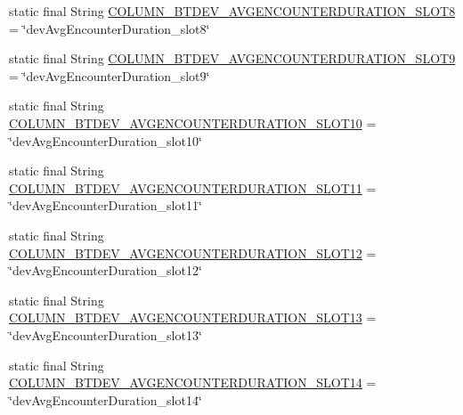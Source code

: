 \begin{DoxyCompactItemize}
\item 
static final String \hyperlink{classcom_1_1copelabs_1_1oiframework_1_1socialproximity_1_1_s_q_lite_helper_afa1acefb9ac52993d28799345bf94d49}{C\+O\+L\+U\+M\+N\+\_\+\+B\+T\+D\+E\+V\+\_\+\+A\+V\+G\+E\+N\+C\+O\+U\+N\+T\+E\+R\+D\+U\+R\+A\+T\+I\+O\+N\+\_\+\+S\+L\+O\+T8} = \char`\"{}dev\+Avg\+Encounter\+Duration\+\_\+slot8\char`\"{}
\item 
static final String \hyperlink{classcom_1_1copelabs_1_1oiframework_1_1socialproximity_1_1_s_q_lite_helper_a39c07bc84c3220997df50296c7d58ec0}{C\+O\+L\+U\+M\+N\+\_\+\+B\+T\+D\+E\+V\+\_\+\+A\+V\+G\+E\+N\+C\+O\+U\+N\+T\+E\+R\+D\+U\+R\+A\+T\+I\+O\+N\+\_\+\+S\+L\+O\+T9} = \char`\"{}dev\+Avg\+Encounter\+Duration\+\_\+slot9\char`\"{}
\item 
static final String \hyperlink{classcom_1_1copelabs_1_1oiframework_1_1socialproximity_1_1_s_q_lite_helper_ab21157b336ae9f13c90f0589426c9d81}{C\+O\+L\+U\+M\+N\+\_\+\+B\+T\+D\+E\+V\+\_\+\+A\+V\+G\+E\+N\+C\+O\+U\+N\+T\+E\+R\+D\+U\+R\+A\+T\+I\+O\+N\+\_\+\+S\+L\+O\+T10} = \char`\"{}dev\+Avg\+Encounter\+Duration\+\_\+slot10\char`\"{}
\item 
static final String \hyperlink{classcom_1_1copelabs_1_1oiframework_1_1socialproximity_1_1_s_q_lite_helper_aeb5a3e7fbf10b907bbe39cc8e693e486}{C\+O\+L\+U\+M\+N\+\_\+\+B\+T\+D\+E\+V\+\_\+\+A\+V\+G\+E\+N\+C\+O\+U\+N\+T\+E\+R\+D\+U\+R\+A\+T\+I\+O\+N\+\_\+\+S\+L\+O\+T11} = \char`\"{}dev\+Avg\+Encounter\+Duration\+\_\+slot11\char`\"{}
\item 
static final String \hyperlink{classcom_1_1copelabs_1_1oiframework_1_1socialproximity_1_1_s_q_lite_helper_abc1b287d4e4071776d025ff203f0cb70}{C\+O\+L\+U\+M\+N\+\_\+\+B\+T\+D\+E\+V\+\_\+\+A\+V\+G\+E\+N\+C\+O\+U\+N\+T\+E\+R\+D\+U\+R\+A\+T\+I\+O\+N\+\_\+\+S\+L\+O\+T12} = \char`\"{}dev\+Avg\+Encounter\+Duration\+\_\+slot12\char`\"{}
\item 
static final String \hyperlink{classcom_1_1copelabs_1_1oiframework_1_1socialproximity_1_1_s_q_lite_helper_a7e00e16a49501db8ef9d8345fb85444d}{C\+O\+L\+U\+M\+N\+\_\+\+B\+T\+D\+E\+V\+\_\+\+A\+V\+G\+E\+N\+C\+O\+U\+N\+T\+E\+R\+D\+U\+R\+A\+T\+I\+O\+N\+\_\+\+S\+L\+O\+T13} = \char`\"{}dev\+Avg\+Encounter\+Duration\+\_\+slot13\char`\"{}
\item 
static final String \hyperlink{classcom_1_1copelabs_1_1oiframework_1_1socialproximity_1_1_s_q_lite_helper_a9e0ee8840e3194657b740ea34d5ac3c2}{C\+O\+L\+U\+M\+N\+\_\+\+B\+T\+D\+E\+V\+\_\+\+A\+V\+G\+E\+N\+C\+O\+U\+N\+T\+E\+R\+D\+U\+R\+A\+T\+I\+O\+N\+\_\+\+S\+L\+O\+T14} = \char`\"{}dev\+Avg\+Encounter\+Duration\+\_\+slot14\char`\"{}

\end{DoxyCompactItemize}
